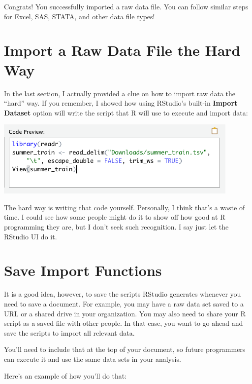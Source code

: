 \documentclass[
]{book}
\begin{document}
\begin{center}
Congrats! You successfully imported a raw data file. You can follow similar steps for Excel, SAS, STATA, and other data file types!

\hypertarget{import-a-raw-data-file-the-hard-way}{%
\section{Import a Raw Data File the Hard Way}\label{import-a-raw-data-file-the-hard-way}}

In the last section, I actually provided a clue on how to import raw data the ``hard'' way. If you remember, I showed how using RStudio's built-in \textbf{Import Dataset} option will write the script that R will use to execute and import data:

\begin{center}\includegraphics[width=0.6\linewidth]{1.63_NewCode} \end{center}

The hard way is writing that code yourself. Personally, I think that's a waste of time. I could see how some people might do it to show off how good at R programming they are, but I don't seek such recognition. I say just let the RStudio UI do it.

\hypertarget{save-import-functions}{%
\section{Save Import Functions}\label{save-import-functions}}

It is a good idea, however, to save the scripts RStudio generates whenever you need to save a document. For example, you may have a raw data set saved to a URL or a shared drive in your organization. You may also need to share your R script as a saved file with other people. In that case, you want to go ahead and save the scripts to import all relevant data.

You'll need to include that at the top of your document, so future programmers can execute it and use the same data sets in your analysis.

Here's an example of how you'll do that:


\end{center}
\end{document}
